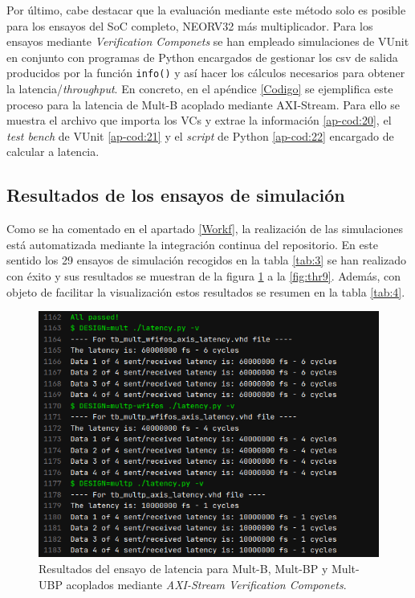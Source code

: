 Por último, cabe destacar que la evaluación mediante este método solo es posible para los ensayos del SoC completo, NEORV32 más multiplicador.
Para los ensayos mediante \textit{Verification Componets} se han empleado simulaciones de VUnit en conjunto con programas de Python encargados de gestionar los csv de salida producidos por la función \texttt{info()} y así hacer los cálculos necesarios para obtener la latencia/\textit{throughput}.
En concreto, en el apéndice \ref{Codigo} se ejemplifica este proceso para la latencia de Mult-B acoplado mediante AXI-Stream.
Para ello se muestra el archivo que importa los VCs y extrae la información \ref{ap-cod:20}, el \textit{test bench} de VUnit \ref{ap-cod:21} y el \textit{script} de Python \ref{ap-cod:22} encargado de calcular a latencia.

\subsection{Resultados de los ensayos de simulación}


Como se ha comentado en el apartado \ref{Workf}, la realización de las simulaciones está automatizada mediante la integración continua del repositorio.
En este sentido los 29 ensayos de simulación recogidos en la tabla \ref{tab:3} se han realizado con éxito y sus resultados se muestran de la figura \ref{fig:lat1} a la \ref{fig:thr9}.
Además, con objeto de facilitar la visualización estos resultados se resumen en la tabla \ref{tab:4}.

\begin{figure}[H]
    \centering
    \includegraphics[width=14cm]{Figuras/result/lat1.png}
    \caption{Resultados del ensayo de latencia para Mult-B, Mult-BP y Mult-UBP acoplados mediante \textit{AXI-Stream Verification Componets}.}
    \label{fig:lat1}
\end{figure}

